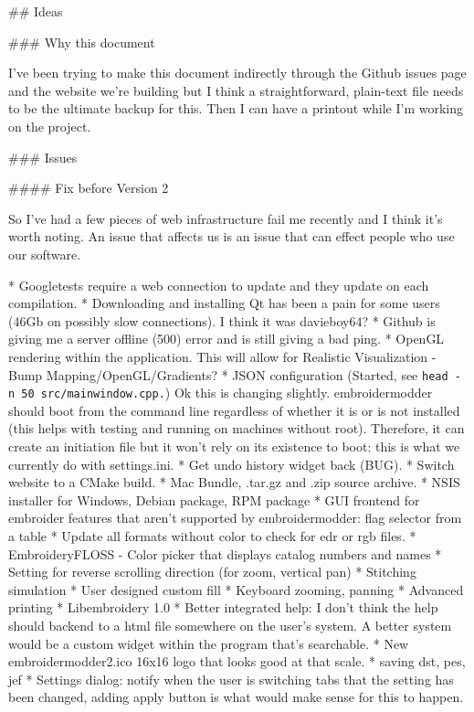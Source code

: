 ## Ideas

### Why this document

I've been trying to make this document indirectly through the Github
issues page and the website we're building but I think a
straightforward, plain-text file needs to be the ultimate backup for
this. Then I can have a printout while I'm working on the project.

### Issues

#### Fix before Version 2

So I've had a few pieces of web infrastructure fail me recently and I
think it's worth noting. An issue that affects us is an issue that can
effect people who use our software.

* Googletests require a web connection to update and they update on each compilation.
* Downloading and installing Qt has been a pain for some users (46Gb on possibly slow connections). I think it was davieboy64?
* Github is giving me a server offline (500) error and is still giving a bad ping.
* OpenGL rendering within the application. This will allow for Realistic Visualization - Bump Mapping/OpenGL/Gradients?
* JSON configuration (Started, see \texttt{head\ -n\ 50\ src/mainwindow.cpp.}) Ok this is changing slightly. embroidermodder should boot from the command line regardless of whether it is or is not installed (this helps with testing and running on machines without root). Therefore, it can create an initiation file but it won't rely on its existence to boot: this is what we currently do with settings.ini.
* Get undo history widget back (BUG).
* Switch website to a CMake build.
* Mac Bundle, .tar.gz and .zip source archive.
* NSIS installer for Windows, Debian package, RPM package
* GUI frontend for embroider features that aren't supported by  embroidermodder: flag selector from a table
* Update all formats without color to check for edr or rgb files.
* EmbroideryFLOSS - Color picker that displays catalog numbers and names
* Setting for reverse scrolling direction (for zoom, vertical pan)
* Stitching simulation
* User designed custom fill
* Keyboard zooming, panning
* Advanced printing
* Libembroidery 1.0
* Better integrated help: I don't think the help should backend to a html file somewhere on the user's system. A better system would be a custom widget within the program that's searchable.
* New embroidermodder2.ico 16x16 logo that looks good at that scale.
* saving dst, pes, jef
* Settings dialog: notify when the user is switching tabs that the setting has been changed, adding apply button is what would make sense for this to happen.
